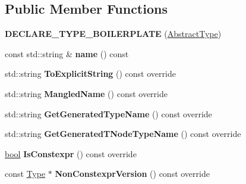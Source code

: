 \subsection*{Public Member Functions}
\begin{DoxyCompactItemize}
\item 
\mbox{\label{classv8_1_1internal_1_1torque_1_1AbstractType_ade1906cc0b539119e2107be6e1aa1fb5}} 
{\bfseries D\+E\+C\+L\+A\+R\+E\+\_\+\+T\+Y\+P\+E\+\_\+\+B\+O\+I\+L\+E\+R\+P\+L\+A\+TE} (\mbox{\hyperlink{classv8_1_1internal_1_1torque_1_1AbstractType}{Abstract\+Type}})
\item 
\mbox{\label{classv8_1_1internal_1_1torque_1_1AbstractType_af3e4c437161d37b81c958146eb2b3d07}} 
const std\+::string \& {\bfseries name} () const
\item 
\mbox{\label{classv8_1_1internal_1_1torque_1_1AbstractType_aa7082bc838e26a49c43ab93091d6a537}} 
std\+::string {\bfseries To\+Explicit\+String} () const override
\item 
\mbox{\label{classv8_1_1internal_1_1torque_1_1AbstractType_a0b4f7e48cd4d74d6f38bba9820ba03fe}} 
std\+::string {\bfseries Mangled\+Name} () const override
\item 
\mbox{\label{classv8_1_1internal_1_1torque_1_1AbstractType_ae5b60e59b3ff6eb1ab68ac930afad501}} 
std\+::string {\bfseries Get\+Generated\+Type\+Name} () const override
\item 
\mbox{\label{classv8_1_1internal_1_1torque_1_1AbstractType_af859bbcc539a50364c437b81c8e108f8}} 
std\+::string {\bfseries Get\+Generated\+T\+Node\+Type\+Name} () const override
\item 
\mbox{\label{classv8_1_1internal_1_1torque_1_1AbstractType_a0ff8b75fa54058672998314a8526289d}} 
\mbox{\hyperlink{classbool}{bool}} {\bfseries Is\+Constexpr} () const override
\item 
\mbox{\label{classv8_1_1internal_1_1torque_1_1AbstractType_a1c6e6a1f84b9259baa21da4517818783}} 
const \mbox{\hyperlink{classv8_1_1internal_1_1torque_1_1Type}{Type}} $\ast$ {\bfseries Non\+Constexpr\+Version} () const override
\end{DoxyCompactItemize}
